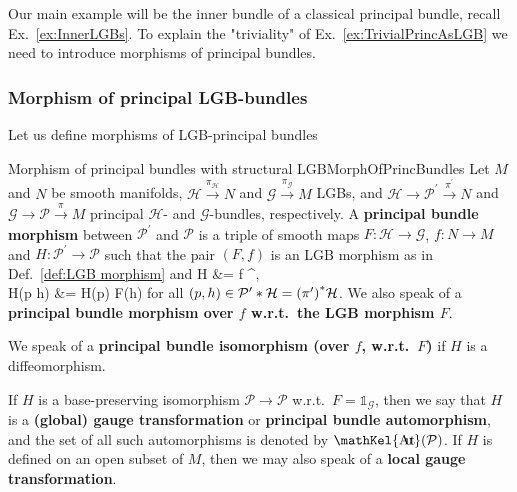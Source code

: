 \documentclass[a4paper,oneside,11pt,bibliography=totoc]{scrartcl}
\DeclareMathOperator{\sAut}{\mathKel{A\mkern-5.5mu u\mkern-4mu t\mkern-1.5mu}}
\def\ba#1\ea{\begin{align}#1\end{align}}
\theoremstyle{plain}
\theoremstyle{remark}
\theoremstyle{definition}
\begin{document}
Our main example will be the inner bundle of a classical principal bundle, recall Ex.\ \ref{ex:InnerLGBs}. To explain the "triviality" of Ex.\ \ref{ex:TrivialPrincAsLGB} we need to introduce morphisms of principal bundles.

\subsubsection{Morphism of principal LGB-bundles}

Let us define morphisms of LGB-principal bundles

\begin{definitions}{Morphism of principal bundles with structural LGB}{MorphOfPrincBundles}
Let $M$ and $N$ be smooth manifolds, $\mathcal{H} \stackrel{\pi_{\mathcal{H}}}{\to} N$ and $\mathcal{G} \stackrel{\pi_{\mathcal{G}}}{\to} M$ LGBs, and $\mathcal{H} \to \mathcal{P}^\prime \stackrel{\pi^\prime}{\to} N$ and $\mathcal{G} \to \mathcal{P} \stackrel{\pi}{\to} M$ principal $\mathcal{H}$- and $\mathcal{G}$-bundles, respectively. A \textbf{principal bundle morphism} between $\mathcal{P}^\prime$ and $\mathcal{P}$ is a triple of smooth maps $F: \mathcal{H} \to \mathcal{G}$, $f: N \to M$ and $H: \mathcal{P}^\prime \to \mathcal{P}$ such that the pair $(F, f)$ is an LGB morphism as in Def.\ \ref{def:LGB morphism} and
\ba
\pi \circ H &= f \circ \pi^\prime,\label{PrincMorphoverBaseMap}\\
H(p \cdot h) &= H(p) \cdot F(h)\label{PrincMorphLGBEquiv}
\ea
for all $(p, h) \in \mathcal{P}^\prime * \mathcal{H} = \mleft(\pi^\prime\mright)^*\mathcal{H}$. We also speak of a \textbf{principal bundle morphism over $f$ w.r.t.\ the LGB morphism $F$}.

We speak of a \textbf{principal bundle isomorphism (over $f$, w.r.t.\ $F$)} if $H$ is a diffeomorphism. 

If $H$ is a base-preserving isomorphism $\mathcal{P} \to \mathcal{P}$ w.r.t.\ $F = \mathds{1}_{\mathcal{G}}$, then we say that $H$ is a \textbf{(global) gauge transformation} or \textbf{principal bundle automorphism}, and the set of all such automorphisms is denoted by $\sAut(\mathcal{P})$. If $H$ is defined on an open subset of $M$, then we may also speak of a \textbf{local gauge transformation}.
\end{definitions}
\end{document}
